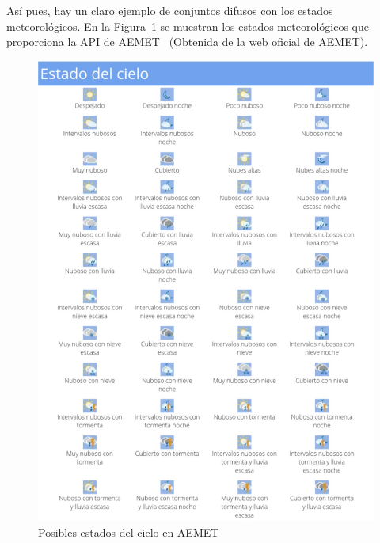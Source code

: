 Así pues, hay un claro ejemplo de conjuntos difusos con los estados meteorológicos. En la Figura~\ref{fig:estadoCielo} se muestran los estados meteorológicos que proporciona la \gls{API} de \gls{AEMET}~\cite{Aemet} (Obtenida de la web oficial de \textcopyright AEMET).
\begin{figure}[H]
	\centering
	\includegraphics[width=17cm]{figs/estadoCieloAEMET.png}
	\caption{Posibles estados del cielo en AEMET}
	\label{fig:estadoCielo}
\end{figure}
